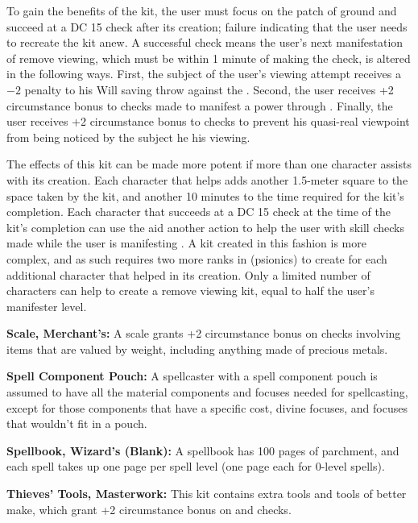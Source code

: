 To gain the benefits of the kit, the user must focus on the patch of ground and succeed at a DC 15  check after its creation; failure indicating that the user needs to recreate the kit anew. A successful check means the user's next manifestation of remove viewing, which must be within 1 minute of making the check, is altered in the following ways. First, the subject of the user's viewing attempt receives a $-2$ penalty to his Will saving throw against the . Second, the user receives +2 circumstance bonus to  checks made to manifest a power through . Finally, the user receives +2 circumstance bonus to  checks to prevent his quasi-real viewpoint from being noticed by the subject he his viewing.

The effects of this kit can be made more potent if more than one character assists with its creation. Each character that helps adds another 1.5-meter square to the space taken by the kit, and another 10 minutes to the time required for the kit's completion. Each character that succeeds at a DC 15  check at the time of the kit's completion can use the aid another action to help the user with skill checks made while the user is manifesting . A kit created in this fashion is more complex, and as such requires two more ranks in  (psionics) to create for each additional character that helped in its creation. Only a limited number of characters can help to create a remove viewing kit, equal to half the user's manifester level.

\textbf{Scale, Merchant's:} A scale grants +2 circumstance bonus on  checks involving items that are valued by weight, including anything made of precious metals.

\textbf{Spell Component Pouch:} A spellcaster with a spell component pouch is assumed to have all the material components and focuses needed for spellcasting, except for those components that have a specific cost, divine focuses, and focuses that wouldn't fit in a pouch.

\textbf{Spellbook, Wizard's (Blank):} A spellbook has 100 pages of parchment, and each spell takes up one page per spell level (one page each for 0-level spells).

\textbf{Thieves' Tools, Masterwork:} This kit contains extra tools and tools of better make, which grant +2 circumstance bonus on  and  checks.

